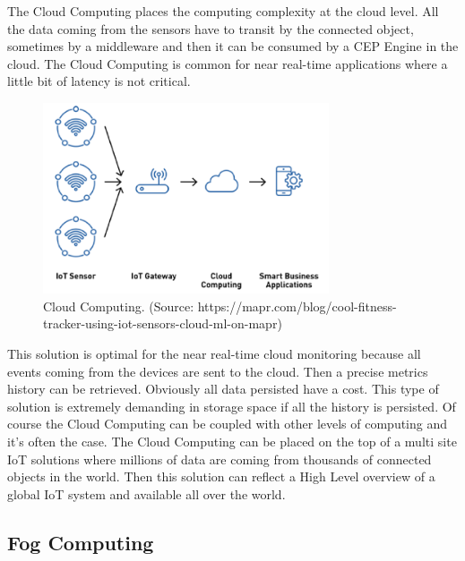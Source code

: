 \documentclass[11pt]{article}
\begin{document}
The Cloud Computing places the computing complexity at the cloud level. All the data coming from the sensors have to transit by the connected object, sometimes by a middleware and then it can be consumed by a CEP Engine in the cloud. The Cloud Computing is common for near real-time applications where a little bit of latency is not critical.
\newline
\begin{figure}[h]
	\includegraphics[width=\textwidth,height=160pt]{assets/Cloud_Computing.png}
	\caption[Cloud Computing]{
	Cloud Computing. (Source: https://mapr.com/blog/cool-fitness-tracker-using-iot-sensors-cloud-ml-on-mapr)}
	\label{fig:Cloud-Computing}
\end{figure}

This solution is optimal for the near real-time cloud monitoring because all events coming from the devices are sent to the cloud. Then a precise metrics history can be retrieved. Obviously all data persisted have a cost. This type of solution is extremely demanding in storage space if all the history is persisted.
\newline
\newline
Of course the Cloud Computing can be coupled with other levels of computing and it's often the case. The Cloud Computing can be placed on the top of a multi site IoT solutions where millions of data are coming from thousands of connected objects in the world. Then this solution can reflect a High Level overview of a global IoT system and available all over the world.


\subsection{Fog Computing}
\end{document}
